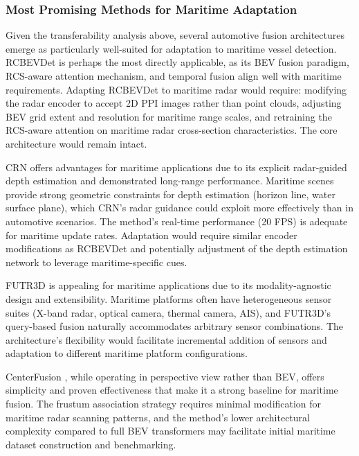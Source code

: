 \subsubsection{Most Promising Methods for Maritime Adaptation}

Given the transferability analysis above, several automotive fusion architectures emerge as particularly well-suited for adaptation to maritime vessel detection. RCBEVDet \cite{Lin2024RCBEVDet} is perhaps the most directly applicable, as its BEV fusion paradigm, RCS-aware attention mechanism, and temporal fusion align well with maritime requirements. Adapting RCBEVDet to maritime radar would require: modifying the radar encoder to accept 2D PPI images rather than point clouds, adjusting BEV grid extent and resolution for maritime range scales, and retraining the RCS-aware attention on maritime radar cross-section characteristics. The core architecture would remain intact.

CRN \cite{Kim2023CRN} offers advantages for maritime applications due to its explicit radar-guided depth estimation and demonstrated long-range performance. Maritime scenes provide strong geometric constraints for depth estimation (horizon line, water surface plane), which CRN's radar guidance could exploit more effectively than in automotive scenarios. The method's real-time performance (20 FPS) is adequate for maritime update rates. Adaptation would require similar encoder modifications as RCBEVDet and potentially adjustment of the depth estimation network to leverage maritime-specific cues.

FUTR3D \cite{Chen2023FUTR3D} is appealing for maritime applications due to its modality-agnostic design and extensibility. Maritime platforms often have heterogeneous sensor suites (X-band radar, optical camera, thermal camera, AIS), and FUTR3D's query-based fusion naturally accommodates arbitrary sensor combinations. The architecture's flexibility would facilitate incremental addition of sensors and adaptation to different maritime platform configurations.

CenterFusion \cite{Nabati2021CenterFusion}, while operating in perspective view rather than BEV, offers simplicity and proven effectiveness that make it a strong baseline for maritime fusion. The frustum association strategy requires minimal modification for maritime radar scanning patterns, and the method's lower architectural complexity compared to full BEV transformers may facilitate initial maritime dataset construction and benchmarking.

